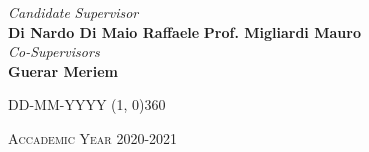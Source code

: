 \documentclass[a4paper, 12pt, twoside, openright]{book}
\begin{document}
\begin{titlepage}
\vfill
\begin{normalsize}
\begin{flushleft}
  \hspace{65pt} \textit{Candidate} \hspace{130pt} \textit{Supervisor}\\
  \vspace{5pt}
  \hspace{25pt} \large{\textbf{\footnotesize{Di Nardo Di Maio Raffaele}}} \hspace{55pt} \large{\textbf{\footnotesize{Prof. Migliardi Mauro}}}\\
  \vspace{50pt}
  \hspace{240pt} \normalsize{\textit{Co-Supervisors}}\\
  \vspace{5pt}
  \hspace{242pt} \large{\textbf{\footnotesize{Guerar Meriem}}}
\end{flushleft}
\end{normalsize}

\vfill
\begin{center}
\textsc{DD-MM-YYYY}
\hspace{-0.2cm}
\line(1, 0){360}

\textsc{Accademic Year 2020-2021}
\end{center}
\end{titlepage}
\end{document}
